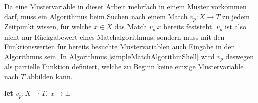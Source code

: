 Da eine Mustervariable in dieser Arbeit mehrfach in einem Muster vorkommen darf, muss ein Algorithmus beim Suchen nach einem Match $v_p \colon X \rightarrow T$ zu jedem Zeitpunkt wissen, für welche $x \in X$ das Match $v_p~x$ bereits feststeht. $v_p$ ist also nicht nur Rückgabewert eines Matchalgorithmus, sondern muss mit den Funktionswerten für bereits besuchte Mustervariablen auch Eingabe in den Algorithmus sein. In Algorithmus \ref{simpleMatchAlgorithmShell} wird $v_p$ deswegen als partielle Funktion definiert, welche zu Beginn keine einzige Mustervariable nach $T$ abbilden kann. \\

\begin{algorithm}
\DontPrintSemicolon
\caption{$\mathrm{simpleMatchAlgorithmShell} \colon M \times T \rightarrow (\mathit{Bool}, X \rightharpoonup T)$}\label{simpleMatchAlgorithmShell}

\textbf{let} $v_p \colon X \rightharpoonup T,~ x \mapsto \bot$\;
\end{algorithm}

\begin{algorithm}
\DontPrintSemicolon
\caption{$\mathrm{simpleMatchAlgorithm} \colon M \times T \times (X \rightharpoonup T) \rightarrow (\mathit{Bool}, X \rightharpoonup T)$}\label{simpleMatchAlgorithm}

 {
}
\end{algorithm}



